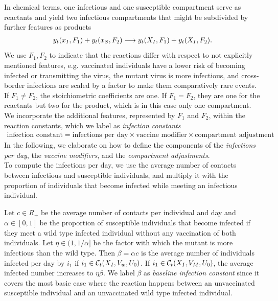 In chemical terms, one infectious and one susceptible compartment serve as reactants and yield two infectious compartments that might be subdivided by further features as products
\begin{align}
\label{eq:general_infection}
y_t(x_I, F_1) + y_t(x_S, F_2) \longrightarrow y_t(X_I, F_1) + y_t(X_I, F_2).
\end{align}
We use $F_1, F_2$ to indicate that the reactions differ with respect to not explicitly mentioned features, e.g. vaccinated individuals have a lower risk of becoming infected or transmitting the virus, the mutant virus is more infectious, and cross-border infections are scaled by a factor to make them comparatively rare events. If $F_1 \neq F_2$, the stoichiometric coefficients are one. If $F_1=F_2$, they are one for the reactants but two for the product, which is in this case only one compartment. We incorporate the additional features, represented by $F_1$ and $F_2$, within the reaction constants, which we label as \textit{infection constants}
\begin{align*}
\text{infection constant} = \text{infections per day} \times \text{vaccine modifier} \times \text{compartment adjustment}
\end{align*}
In the following, we elaborate on how to define the components of the \textit{infections per day}, the \textit{vaccine modifiers}, and the \textit{compartment adjustments}.\\

To compute the infections per day, we use the average number of contacts between infectious and susceptible individuals, and multiply it with the proportion of individuals that become infected while meeting an infectious individual.

Let $c \in R_+$ be the average number of contacts per individual and day and $\alpha \in [0,1]$ be the proportion of susceptible individuals that become infected if they meet a wild type infected individual without any vaccination of both individuals. Let $\eta \in (1, 1/\alpha]$ be the factor with which the mutant is more infectious than the wild type. Then $\beta = \alpha c$ is the average number of individuals infected per day by $i_1$ if $i_1 \in \mathcal{C}_t(X_I, V_w, U_0)$. If $i_1 \in \mathcal{C}_t(X_I, V_M, U_0)$, the average infected number increases to $\eta \beta$. We label $\beta$ as \textit{baseline infection constant} since it covers the most basic case where the reaction happens between an unvaccinated susceptible individual and an unvaccinated wild type infected individual. \\

